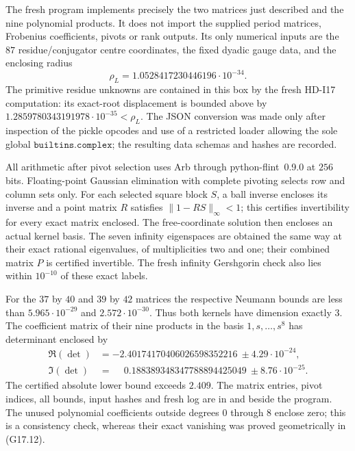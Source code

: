 The fresh program
implements precisely the two matrices just described and the nine
polynomial products.  It does not import the supplied period
matrices, Frobenius coefficients, pivots or rank outputs.
Its only numerical inputs are the $87$ residue/conjugator centre
coordinates, the fixed dyadic gauge data, and the enclosing radius
\[
                   \rho_L=1.0528417230446196\cdot10^{-34}.
\]
The primitive residue unknowns are contained in this box by the
fresh HD-I17 computation: its exact-root displacement is bounded
above by $1.2859780343191978\cdot10^{-35}<\rho_L$.
The JSON conversion was made only after inspection of the pickle
opcodes and use of a restricted loader allowing the sole global
$\mathtt{builtins.complex}$; the resulting data schemas and hashes
are recorded.

All arithmetic after pivot selection uses Arb through
python-flint~0.9.0 at $256$ bits.  Floating-point Gaussian
elimination with complete pivoting selects row and column sets only.
For each selected square block $S$, a ball inverse encloses its
inverse and a point matrix $R$ satisfies
$\|1-RS\|_\infty<1$; this certifies invertibility for every exact
matrix enclosed.  The free-coordinate solution then encloses an
actual kernel basis.  The seven infinity eigenspaces are obtained
the same way at their exact rational eigenvalues, of multiplicities
two and one; their combined matrix $P$ is certified invertible.
The fresh infinity Gershgorin check also lies within $10^{-10}$
of these exact labels.

For the $37$ by $40$ and $39$ by $42$ matrices the respective
Neumann bounds are less than
$5.965\cdot10^{-29}$ and $2.572\cdot10^{-30}$.
Thus both kernels have dimension exactly $3$.
The coefficient matrix of their nine products in the basis
$1,s,\ldots,s^8$ has determinant enclosed by
\begin{align*}
 \Re(\det)&=-2.40174170406026598352216
                         \ \pm 4.29\cdot10^{-24},\\
 \Im(\det)&=\phantom{-}0.188389348347788894425049
                         \ \pm 8.76\cdot10^{-25}.
\end{align*}
The certified absolute lower bound exceeds $2.409$.
The matrix entries, pivot indices, all bounds, input hashes and
fresh log are in
and  beside the program.
The unused polynomial coefficients outside degrees $0$ through $8$
enclose zero; this is a consistency check, whereas their exact
vanishing was proved geometrically in (G17.12).

